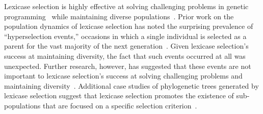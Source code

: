 Lexicase selection is highly effective at solving challenging problems in genetic programming~\cite{helmuth_general_2015,helmuth_solving_2015} while maintaining diverse populations~\cite{helmuth_effects_2016}. Prior work on the population dynamics of lexicase selection has noted the surprising prevalence of ``hyperselection events,'' occasions in which a single individual is selected as a parent for the vast majority of the next generation~\cite{mcphee_using_2016}. Given lexicase selection's success at maintaining diversity, the fact that such events occurred at all was unexpected. Further research, however, has suggested that these events are not important to lexicase selection's success at solving challenging problems and maintaining diversity~\cite{helmuth_impact_2016}.
Additional case studies of phylogenetic trees generated by lexicase selection
suggest that lexicase selection promotes the existence of
sub-populations that are focused on a specific selection criterion~\cite{mcphee_visualizing_2016}.



